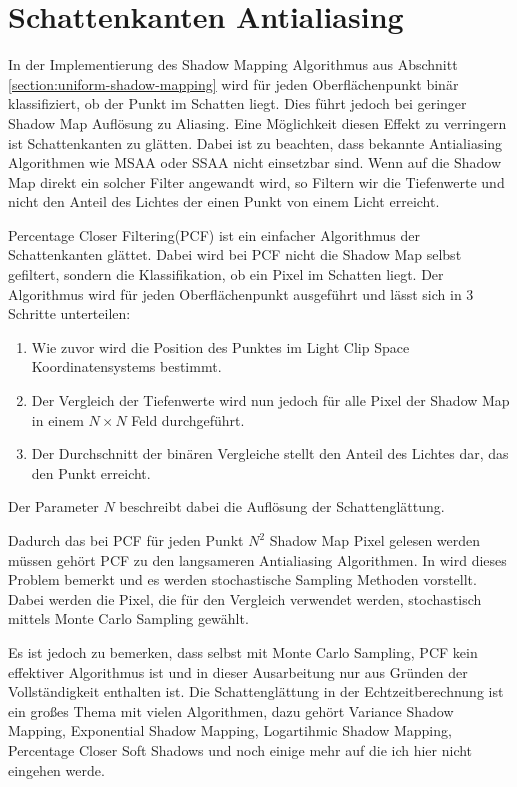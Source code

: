 \section{Schattenkanten Antialiasing}
\label{section:pcf}
In der Implementierung des Shadow Mapping Algorithmus aus Abschnitt \ref{section:uniform-shadow-mapping} wird für jeden Oberflächenpunkt 
binär klassifiziert, ob der Punkt im Schatten liegt. Dies führt jedoch bei geringer Shadow Map Auflösung zu Aliasing.
Eine Möglichkeit diesen Effekt zu verringern ist Schattenkanten zu glätten.
Dabei ist zu beachten, dass bekannte Antialiasing Algorithmen wie MSAA oder SSAA nicht einsetzbar sind.
Wenn auf die Shadow Map direkt ein solcher Filter angewandt wird, so Filtern wir die Tiefenwerte und nicht
den Anteil des Lichtes der einen Punkt von einem Licht erreicht.
\par
Percentage Closer Filtering(PCF) \cite{PCF1987} ist ein einfacher Algorithmus der Schattenkanten glättet.
Dabei wird bei PCF nicht die Shadow Map selbst gefiltert, sondern die Klassifikation, ob ein Pixel im Schatten liegt.
Der Algorithmus wird für jeden Oberflächenpunkt ausgeführt und lässt sich in 3 Schritte unterteilen:
\begin{enumerate}
  \item Wie zuvor wird die Position des Punktes im Light Clip Space Koordinatensystems bestimmt.
  \item Der Vergleich der Tiefenwerte wird nun jedoch für alle Pixel der Shadow Map in einem $N\times{}N$ Feld durchgeführt.
  \item Der Durchschnitt der binären Vergleiche stellt den Anteil des Lichtes dar, das den Punkt erreicht.
\end{enumerate}
\par
Der Parameter $N$ beschreibt dabei die Auflösung der Schattenglättung.
\par
Dadurch das bei PCF für jeden Punkt $N^2$ Shadow Map Pixel gelesen werden müssen gehört PCF zu den 
langsameren Antialiasing Algorithmen.
In \cite{PCF1987} wird dieses Problem bemerkt und es werden stochastische Sampling Methoden vorstellt.
Dabei werden die Pixel, die für den Vergleich verwendet werden, stochastisch mittels Monte Carlo Sampling gewählt.
\par
Es ist jedoch zu bemerken, dass selbst mit Monte Carlo Sampling, PCF kein effektiver Algorithmus ist und
in dieser Ausarbeitung nur aus Gründen der Vollständigkeit enthalten ist. 
Die Schattenglättung in der Echtzeitberechnung ist ein großes Thema mit vielen
Algorithmen, dazu gehört Variance Shadow Mapping, Exponential Shadow Mapping, Logartihmic Shadow Mapping,
Percentage Closer Soft Shadows und noch einige mehr auf die ich hier nicht eingehen werde.

